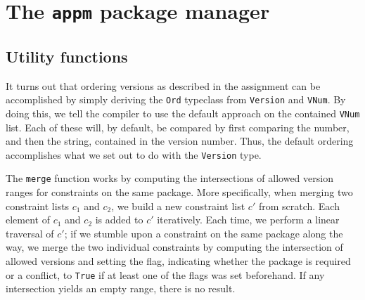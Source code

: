 \section*{The \texttt{appm} package manager}

\subsection*{Utility functions}
It turns out that ordering versions as described in the assignment can be accomplished by simply deriving the \texttt{Ord} typeclass from \texttt{Version} and \texttt{VNum}. By doing this, we tell the compiler to use the default approach on the contained \texttt{VNum} list. Each of these will, by default, be compared by first comparing the number, and then the string, contained in the version number. Thus, the default ordering accomplishes what we set out to do with the \texttt{Version} type.

%

 The \texttt{merge} function works by computing the intersections of allowed version ranges for constraints on the same package. More specifically, when merging two constraint lists $c_1$ and $c_2$, we build a new constraint list $c'$ from scratch. Each element of $c_1$ and $c_2$ is added to $c'$ iteratively. Each time, we perform a linear traversal of $c'$; if we stumble upon a constraint on the same package along the way, we merge the two individual constraints by computing the intersection of allowed versions and setting the flag, indicating whether the package is required or a conflict, to \texttt{True} if at least one of the flags was set beforehand. If any intersection yields an empty range, there is no result.

